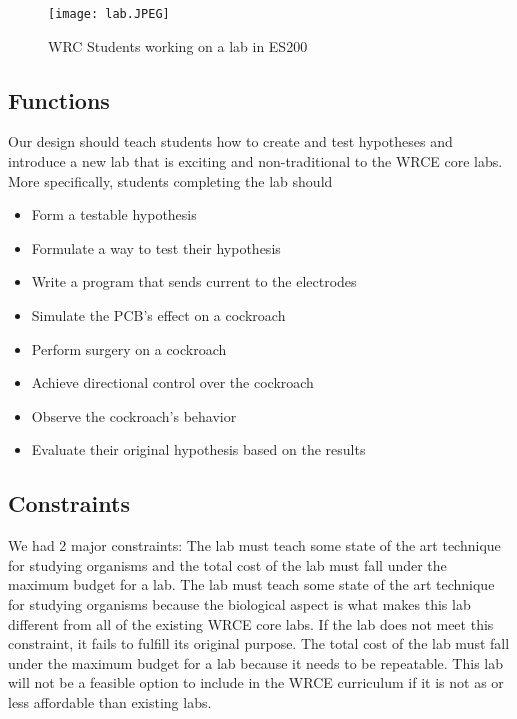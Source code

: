 \documentclass{article}
\begin{document}
\begin{figure}[ht!]
\centering
\texttt{[image: lab.JPEG]}
\caption{WRC Students working on a lab in ES200}
\label{fig:hollywood}
\end{figure}

\subsection{Functions}
 Our design should teach students how to create and test hypotheses and introduce a new lab that is exciting and non-traditional to the WRCE core labs. More specifically, students completing the lab should

\begin{itemize}
  \item Form a testable hypothesis
  \item Formulate a way to test their hypothesis
  \item Write a program that sends current to the electrodes
  \item Simulate the PCB's effect on a cockroach
  \item Perform surgery on a cockroach
  \item Achieve directional control over the cockroach
  \item Observe the cockroach's behavior
  \item Evaluate their original hypothesis based on the results
\end{itemize}

\subsection{Constraints}
 We had 2 major constraints: The lab must teach some state of the art technique for studying organisms and the total cost of the lab must fall under the maximum budget for a lab. The lab must teach some state of the art technique for studying organisms because the biological aspect is what makes this lab different from all of the existing WRCE core labs. If the lab does not meet this constraint, it fails to fulfill its original purpose. The total cost of the lab must fall under the maximum budget for a lab because it needs to be repeatable. This lab will not be a feasible option to include in the WRCE curriculum if it is not as or less affordable than existing labs.
\end{document}
